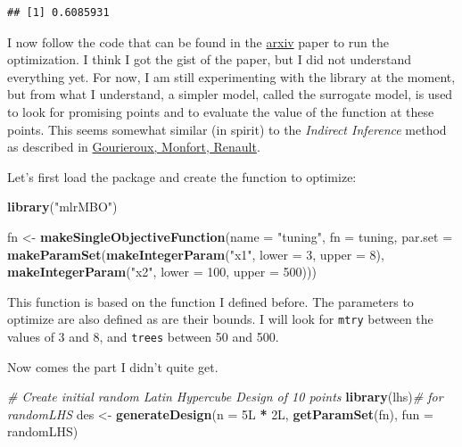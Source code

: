 \documentclass[]{gitbook}
\newenvironment{Shaded}{\begin{snugshade}}{\end{snugshade}}
\newcommand{\CommentTok}[1]{\textcolor[rgb]{0.56,0.35,0.01}{\textit{#1}}}
\newcommand{\DataTypeTok}[1]{\textcolor[rgb]{0.13,0.29,0.53}{#1}}
\newcommand{\DecValTok}[1]{\textcolor[rgb]{0.00,0.00,0.81}{#1}}
\newcommand{\KeywordTok}[1]{\textcolor[rgb]{0.13,0.29,0.53}{\textbf{#1}}}
\newcommand{\NormalTok}[1]{#1}
\newcommand{\OperatorTok}[1]{\textcolor[rgb]{0.81,0.36,0.00}{\textbf{#1}}}
\newcommand{\StringTok}[1]{\textcolor[rgb]{0.31,0.60,0.02}{#1}}
\begin{document}
\begin{verbatim}
## [1] 0.6085931
\end{verbatim}

I now follow the code that can be found in the \href{https://arxiv.org/abs/1703.03373}{arxiv} paper to
run the optimization. I think I got the gist of the paper, but I did not understand everything yet.
For now, I am still experimenting with the library at the moment, but from what I understand, a
simpler model, called the surrogate model, is used to look for promising points and to evaluate the
value of the function at these points. This seems somewhat similar (in spirit) to the
\emph{Indirect Inference} method as described in \href{https://www.jstor.org/stable/2285076}{Gourieroux, Monfort, Renault}.

Let's first load the package and create the function to optimize:

\begin{Shaded}
\begin{Highlighting}[]
\KeywordTok{library}\NormalTok{(}\StringTok{"mlrMBO"}\NormalTok{)}
\end{Highlighting}
\end{Shaded}

\begin{Shaded}
\begin{Highlighting}[]
\NormalTok{fn <-}\StringTok{ }\KeywordTok{makeSingleObjectiveFunction}\NormalTok{(}\DataTypeTok{name =} \StringTok{"tuning"}\NormalTok{,}
                                 \DataTypeTok{fn =}\NormalTok{ tuning,}
                                 \DataTypeTok{par.set =} \KeywordTok{makeParamSet}\NormalTok{(}\KeywordTok{makeIntegerParam}\NormalTok{(}\StringTok{"x1"}\NormalTok{, }\DataTypeTok{lower =} \DecValTok{3}\NormalTok{, }\DataTypeTok{upper =} \DecValTok{8}\NormalTok{),}
                                                        \KeywordTok{makeIntegerParam}\NormalTok{(}\StringTok{"x2"}\NormalTok{, }\DataTypeTok{lower =} \DecValTok{100}\NormalTok{, }\DataTypeTok{upper =} \DecValTok{500}\NormalTok{)))}
\end{Highlighting}
\end{Shaded}

This function is based on the function I defined before. The parameters to optimize are also
defined as are their bounds. I will look for \texttt{mtry} between the values of 3 and 8, and \texttt{trees}
between 50 and 500.

Now comes the part I didn't quite get.

\begin{Shaded}
\begin{Highlighting}[]
\CommentTok{# Create initial random Latin Hypercube Design of 10 points}
\KeywordTok{library}\NormalTok{(lhs)}\CommentTok{# for randomLHS}
\NormalTok{des <-}\StringTok{ }\KeywordTok{generateDesign}\NormalTok{(}\DataTypeTok{n =}\NormalTok{ 5L }\OperatorTok{*}\StringTok{ }\NormalTok{2L, }\KeywordTok{getParamSet}\NormalTok{(fn), }\DataTypeTok{fun =}\NormalTok{ randomLHS)}
\end{Highlighting}
\end{Shaded}
\end{document}

